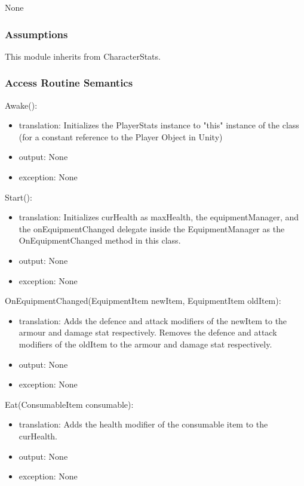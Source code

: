 \documentclass[12pt]{article}
\begin{document}
None

\subsubsection* {Assumptions}

This module inherits from CharacterStats.

\subsubsection* {Access Routine Semantics}

\noindent Awake():
\begin{itemize}
\item translation: Initializes the PlayerStats instance to "this" instance of the class (for a constant reference to the Player Object in Unity)
\item output: None
\item exception: None
\end{itemize}

\noindent Start():
\begin{itemize}
\item translation: Initializes curHealth as maxHealth{\color{magenta}, the equipmentManager,} and the onEquipmentChanged delegate inside the EquipmentManager as the OnEquipmentChanged method in this class.
\item output: None
\item exception: None
\end{itemize}

\noindent OnEquipmentChanged(EquipmentItem newItem, EquipmentItem oldItem):
\begin{itemize}
\item translation: Adds the defence and attack modifiers of the newItem to the armour and damage stat respectively.  Removes the defence and attack modifiers of the oldItem to the armour and damage stat respectively. 
\item output: None
\item exception: None
\end{itemize}

\noindent Eat(ConsumableItem consumable):
\begin{itemize}
\item translation: Adds the health modifier of the consumable item to the curHealth.
\item output: None
\item exception: None
\end{itemize}
\end{document}
